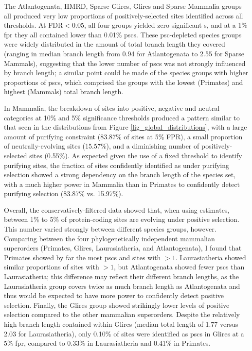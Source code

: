 The Atlantogenata, HMRD, Sparse Glires, Glires and Sparse Mammalia
groups all produced very low proportions of positively-selected sites
identified across all \fpr thresholds. At FDR$<$0.05, all four groups
yielded zero significant \psc{}s, and at a 1\% \ac{fpr} they all
contained lower than 0.01\% \acp{psc}. These \ac{psc}-depleted species
groups were widely distributed in the amount of total branch length
they covered (ranging in median \ngap branch length from 0.94 for
Atlantogenata to 2.55 for Sparse Mammals), suggesting that the lower
number of \acp{psc} was not strongly influenced by branch length; a
similar point could be made of the species groups with higher
proportions of \acp{psc}, which comprised the groups with the lowest
(Primates) and highest (Mammals) total branch length.

In Mammalia, the breakdown of sites into positive, negative and
neutral categories at 10\% and 5\% significance thresholds produced a
pattern similar to that seen in the \omgml distributions from Figure
\ref{fig_global_distributions}, with a large amount of purifying
constraint (83.87\% of sites at 5\% FPR), a small proportion of
neutrally-evolving sites (15.57\%), and a diminishing number of
positively-selected sites (0.55\%). As expected given the use of a
fixed \slrt threshold to identify purifying sites, the fraction of
sites confidently identified as under purifying selection showed a
strong dependency on the branch length of the species set, with a much
higher power in Mammalia than in Primates to confidently detect
purifying selection (83.87\% vs. 15.97\%).

Overall, the conservatively-filtered \sw data showed that, when using
\omgml estimates, between 1\% to 5\% of protein-coding sites are
evolving under positive selection. This number varied strongly between
different species groups, however. Comparing between the four
phylogenetically independent mammalian superorders (Primates, Glires,
Laurasiatheria, and Atlantogenata), I found that Primates showed by
far the most \acp{psc} and sites with \omgml$>1$. Laurasiatheria
showed similar proportions of sites with \omgml$>1$, but Atlantogenata
showed fewer \acp{psc} than Laurasiatheria; this difference may
reflect their different branch lengths, as the Laurasiatheria group
covers twice as much branch length as Atlantogenata and thus would be
expected to have more power to confidently detect positive
selection. Finally, the Glires group showed strikingly lower levels of
positive selection compared to the other mammalian
superorders. Despite the relatively high branch length contained
within Glires (median total length of 1.77 versus 2.03 for
Laurasiatheria), only 0.10\% of sites were identified as \acp{psc} in
Glires at a 5\% \ac{fpr}, compared to 0.33\% in Laurasiatheria and
0.41\% in Primates.


